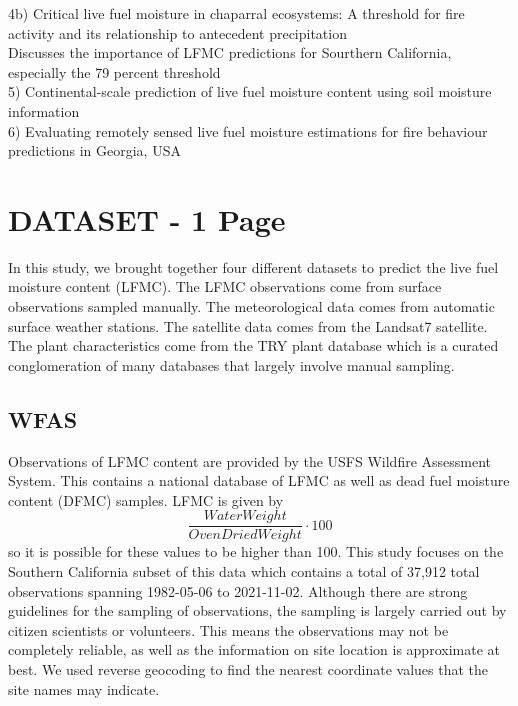 \documentclass[twocolumn,10pt]{article}
\begin{document}
4b) Critical live fuel moisture in chaparral ecosystems: A threshold for ﬁre activity
and its relationship to antecedent precipitation\\
Discusses the importance of LFMC predictions for Sourthern California, especially the 79 percent threshold\\

5) Continental-scale prediction of live fuel moisture content using soil moisture information\\ 
6) Evaluating remotely sensed live fuel moisture estimations for fire behaviour predictions in Georgia, USA

\section{DATASET - 1 Page}
In this study, we brought together four different datasets to predict the live fuel moisture content (LFMC). The LFMC observations come from surface observations sampled manually. The meteorological data comes from automatic surface weather stations. The satellite data comes from the Landsat7 satellite. The plant characteristics come from the TRY plant database which is a curated conglomeration of many databases that largely involve manual sampling. \\

\subsection{WFAS}
Observations of LFMC content are provided by the USFS Wildfire Assessment System. This contains a national database of LFMC as well as dead fuel moisture content (DFMC) samples. LFMC is given by \[\frac{Water Weight}{Oven Dried Weight} \cdot 100\] so it is possible for these values to be higher than 100. This study focuses on the Southern California subset of this data which contains a total of 37,912  total observations spanning 1982-05-06 to 2021-11-02. Although there are strong guidelines for the sampling of observations, the sampling is largely carried out by citizen scientists or volunteers. This means the observations may not be completely reliable, as well as the information on site location is approximate at best. We used reverse geocoding to find the nearest coordinate values that the site names may indicate. \\
\end{document}
